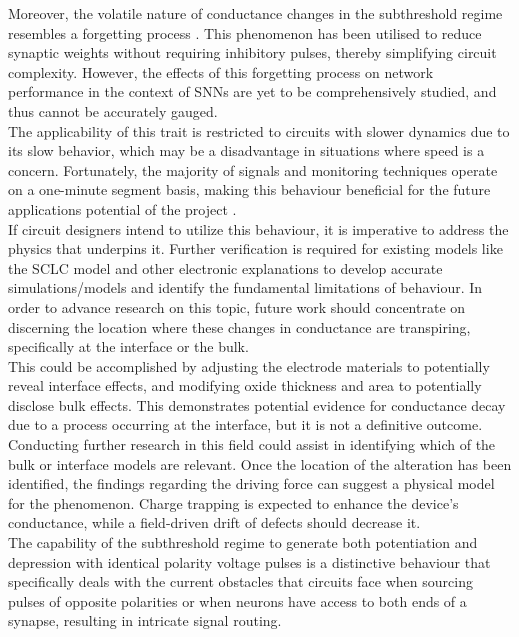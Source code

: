 \noindent Moreover, the volatile nature of conductance changes in the subthreshold regime resembles a forgetting process \cite{li2020enhanced}. This phenomenon has been utilised to reduce synaptic weights without requiring inhibitory pulses, thereby simplifying circuit complexity.  However, the effects of this forgetting process on network performance in the context of SNNs are yet to be comprehensively studied, and thus cannot be accurately gauged.\\

\noindent The applicability of this trait is restricted to circuits with slower dynamics due to its slow behavior, which may be a disadvantage in situations where speed is a concern. Fortunately, the majority of signals and monitoring techniques operate on a one-minute segment basis, making this behaviour beneficial for the future applications potential of the project \cite{vieluf2022seizure}.\\

\noindent If circuit designers intend to utilize this behaviour, it is imperative to address the physics that underpins it. Further verification is required for existing models like the SCLC model and other electronic explanations to develop accurate simulations/models and identify the fundamental limitations of behaviour. In order to advance research on this topic, future work should concentrate on discerning the location where these changes in conductance are transpiring, specifically at the interface or the bulk.\\

\noindent This could be accomplished by adjusting the electrode materials to potentially reveal interface effects, and modifying oxide thickness and area to potentially disclose bulk effects. This demonstrates potential evidence for conductance decay due to a process occurring at the interface, but it is not a definitive outcome. \\

\noindent Conducting further research in this field could assist in identifying which of the bulk or interface models are relevant. Once the location of the alteration has been identified, the findings regarding the driving force can suggest a physical model for the phenomenon. Charge trapping is expected to enhance the device's conductance, while a field-driven drift of defects should decrease it.\\

\noindent The capability of the subthreshold regime to generate both potentiation and depression with identical polarity voltage pulses is a distinctive behaviour that specifically deals with the current obstacles that circuits face when sourcing pulses of opposite polarities or when neurons have access to both ends of a synapse, resulting in intricate signal routing. \\

